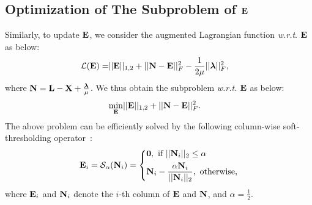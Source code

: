 \documentclass[letterpaper]{article}
\def\bN{{\bf N}}
\def\bE{{\bf E}}
\def\blambda{{\bm \lambda}}
\def\calL{{\mathcal{L}}}
\def\calS{{\mathcal{S}}}
\def\bL{{\bf L}}
\def\bX{{\bf X}}
\def\bX{{\bf X}}
\def\zerocolumn{{\bf 0}}
\def\wrt{\emph{w.r.t}}
\begin{document}
\subsection{Optimization of The Subproblem of $\bE$}

Similarly, to update $\bE$, we consider the augmented Lagrangian function \wrt. $\bE$ as below:
{\small
\begin{align}\label{eq:subproblem_wrt_E_1}
  \calL (\bE) = & || \bE ||_{1,2} + || \bN - \bE ||_F^2 - \frac{1}{2\mu}|| \blambda ||_F^2   ,
\end{align}
}
\noindent
where $\bN = \bL - \bX + \frac{\blambda}{\mu}$.
We thus obtain the subproblem \wrt. $\bE$ as below:
{\small
\begin{align}\label{eq:subproblem_wrt_E_2}
  \min_{\bE} & || \bE ||_{1,2} + || \bN - \bE ||_F^2 .
\end{align}
}
\noindent
The above problem can be efficiently solved by the following column-wise soft-thresholding operator~\cite{xiao2015FaLRR}:
{\small
\begin{align}\label{eq:column_wise_soft_thresholding}
  \bE_{i} = \calS_{\alpha}(\bN_{i}) = \left\{
    \begin{aligned}
      & \zerocolumn,~\text{if}~ ||\bN_{i}||_2 \leq \alpha   \\
      & \bN_{i} - \frac{\alpha \bN_{i}}{|| \bN_{i} ||_2},~\text{otherwise,}
    \end{aligned}
    \right.
\end{align}
}
\noindent
where $\bE_{i}$ and $\bN_{i}$ denote the $i$-th column of $\bE$ and $\bN$,
and $\alpha = \frac{1}{2}$.
\end{document}
